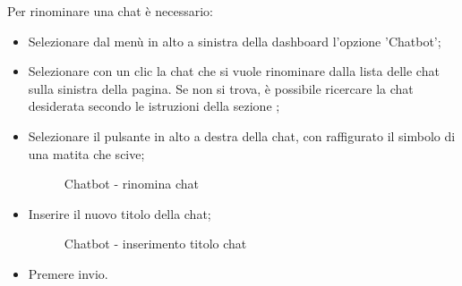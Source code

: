 \documentclass[10pt, a4paper]{article}
\begin{document}
Per rinominare una chat è necessario:
\begin{itemize}
    \item Selezionare dal menù in alto a sinistra della dashboard l'opzione 'Chatbot';
    \item Selezionare con un clic la chat che si vuole rinominare dalla lista delle chat sulla sinistra della pagina. Se non si trova, è possibile ricercare la chat desiderata secondo le istruzioni della sezione ;
    \item Selezionare il pulsante in alto a destra della chat, con raffigurato il simbolo di una matita che scive;
    \begin{figure}[H]
        \centering  
        \caption{Chatbot - rinomina chat}
    \end{figure}
    \item Inserire il nuovo titolo della chat;
    
    \begin{figure}[H]
        \centering  
        \caption{Chatbot - inserimento titolo chat}
    \end{figure}
    \item Premere invio.
\end{itemize}
\end{document}

